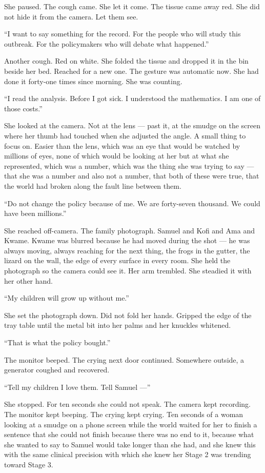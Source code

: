 She paused. The cough came. She let it come. The tissue came away red. She did not hide it from the camera. Let them see.

``I want to say something for the record. For the people who will study this outbreak. For the policymakers who will debate what happened.''

Another cough. Red on white. She folded the tissue and dropped it in the bin beside her bed. Reached for a new one. The gesture was automatic now. She had done it forty-one times since morning. She was counting.

``I read the analysis. Before I got sick. I understood the mathematics. I am one of those costs.''

She looked at the camera. Not at the lens --- past it, at the smudge on the screen where her thumb had touched when she adjusted the angle. A small thing to focus on. Easier than the lens, which was an eye that would be watched by millions of eyes, none of which would be looking at her but at what she represented, which was a number, which was the thing she was trying to say --- that she was a number and also not a number, that both of these were true, that the world had broken along the fault line between them.

``Do not change the policy because of me. We are forty-seven thousand. We could have been millions.''

She reached off-camera. The family photograph. Samuel and Kofi and Ama and Kwame. Kwame was blurred because he had moved during the shot --- he was always moving, always reaching for the next thing, the frogs in the gutter, the lizard on the wall, the edge of every surface in every room. She held the photograph so the camera could see it. Her arm trembled. She steadied it with her other hand.

``My children will grow up without me.''

She set the photograph down. Did not fold her hands. Gripped the edge of the tray table until the metal bit into her palms and her knuckles whitened.

``That is what the policy bought.''

The monitor beeped. The crying next door continued. Somewhere outside, a generator coughed and recovered.

``Tell my children I love them. Tell Samuel ---''

She stopped. For ten seconds she could not speak. The camera kept recording. The monitor kept beeping. The crying kept crying. Ten seconds of a woman looking at a smudge on a phone screen while the world waited for her to finish a sentence that she could not finish because there was no end to it, because what she wanted to say to Samuel would take longer than she had, and she knew this with the same clinical precision with which she knew her Stage 2 was trending toward Stage 3.

